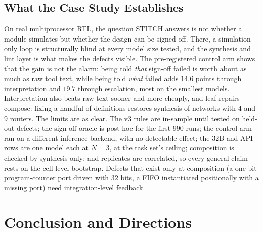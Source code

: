 \documentclass[11pt]{article}
\begin{document}
\subsection{What the Case Study Establishes}
\label{sec:mpsoc-summary}

On real multiprocessor RTL, the question STITCH answers is not whether a module
simulates but whether the design can be signed off. There, a simulation-only
loop is structurally blind at every model size tested, and the synthesis and
lint layer is what makes the defects visible. The pre-registered control arm
shows that the gain is not the alarm: being told \emph{that} sign-off failed is
worth about as much as raw tool text, while being told \emph{what} failed adds
$14.6$ points through interpretation and $19.7$ through escalation, most on the
smallest models. Interpretation also beats raw text sooner and more cheaply,
and leaf repairs compose: fixing a handful of definitions restores synthesis
of networks with $4$ and $9$ routers. The limits are as clear. The v3 rules are in-sample until tested on held-out
defects; the sign-off oracle is post hoc for the first $990$ runs; the control
arm ran on a different inference backend, with no detectable effect; the $32$B
and API rows are one model each at $N{=}3$, at the task set's ceiling;
composition is checked by synthesis only; and replicates are correlated, so
every general claim rests on the cell-level bootstrap. Defects that exist only
at composition (a one-bit program-counter port driven with $32$ bits, a FIFO
instantiated positionally with a missing port) need integration-level
feedback.

\section{Conclusion and Directions}
\label{sec:conclusion}
\end{document}
